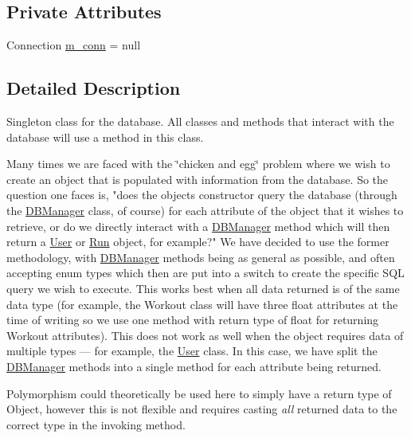 \subsection*{Private Attributes}
\begin{DoxyCompactItemize}
\item 
Connection \mbox{\hyperlink{classcom_1_1activitytracker_1_1_d_b_manager_a064088d13ac09eb147fdc19268771521}{m\+\_\+conn}} = null
\end{DoxyCompactItemize}


\subsection{Detailed Description}
Singleton class for the database. All classes and methods that interact with the database will use a method in this class.

Many times we are faced with the \char`\"{}chicken and egg\char`\"{} problem where we wish to create an object that is populated with information from the database. So the question one faces is, "does the object\textquotesingle{}s constructor query the database (through the \mbox{\hyperlink{classcom_1_1activitytracker_1_1_d_b_manager}{D\+B\+Manager}} class, of course) for each attribute of the object that it wishes to retrieve, or do we directly interact with a \mbox{\hyperlink{classcom_1_1activitytracker_1_1_d_b_manager}{D\+B\+Manager}} method which will then return a \mbox{\hyperlink{classcom_1_1activitytracker_1_1_user}{User}} or \mbox{\hyperlink{classcom_1_1activitytracker_1_1_run}{Run}} object, for example?" We have decided to use the former methodology, with \mbox{\hyperlink{classcom_1_1activitytracker_1_1_d_b_manager}{D\+B\+Manager}} methods being as general as possible, and often accepting enum types which then are put into a switch to create the specific S\+QL query we wish to execute. This works best when all data returned is of the same data type (for example, the Workout class will have three float attributes at the time of writing so we use one method with return type of float for returning Workout attributes). This does not work as well when the object requires data of multiple types --- for example, the \mbox{\hyperlink{classcom_1_1activitytracker_1_1_user}{User}} class. In this case, we have split the \mbox{\hyperlink{classcom_1_1activitytracker_1_1_d_b_manager}{D\+B\+Manager}} methods into a single method for each attribute being returned.

Polymorphism could theoretically be used here to simply have a return type of Object, however this is not flexible and requires casting {\itshape all} returned data to the correct type in the invoking method. 

